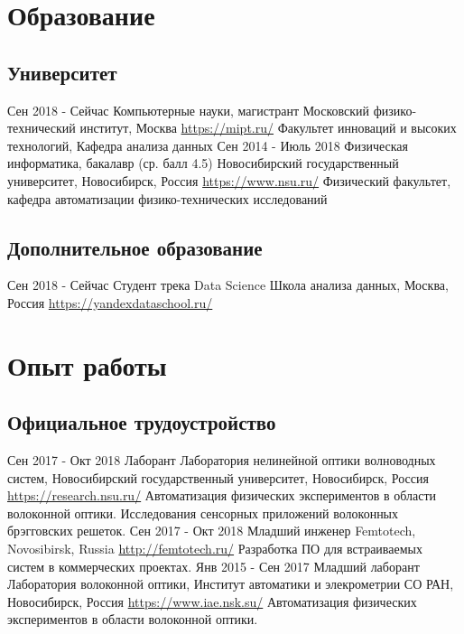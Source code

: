 \documentclass[11pt,a4paper]{moderncv}
\begin{document}
\maketitle

\section{Образование}
  \subsection{Университет}
  \cventry
    {Сен 2018 - Сейчас}
    {Компьютерные науки, магистрант}
    {\newline{}Московский физико-технический институт, Москва}
    {\newline\url{https://mipt.ru/}}{}
    {Факультет инноваций и высоких технологий, Кафедра анализа данных}
  \cventry
    {Сен 2014 - Июль 2018}
    {Физическая информатика, бакалавр (ср. балл 4.5)}
    {\newline{}Новосибирский государственный университет, Новосибирск, Россия}
    {\newline\url{https://www.nsu.ru/}}{}
    {Физический факультет, кафедра автоматизации физико-технических исследований}
  \subsection{Дополнительное образование}
  \cventry
    {Сен 2018 - Сейчас}
    {Студент трека Data Science}
    {\newline{}Школа анализа данных, Москва, Россия}
    {}{\newline\url{https://yandexdataschool.ru/}}{}

\section{Опыт работы}
\subsection{Официальное трудоустройство}
\cventry
  {Сен 2017 - Окт 2018}
  {Лаборант}
  {\newline{}Лаборатория нелинейной оптики волноводных систем, \newline{}
  Новосибирский государственный университет, Новосибирск, Россия}
  {\newline{}\url{https://research.nsu.ru/}}{}
  {Автоматизация физических экспериментов в области волоконной оптики. Исследования сенсорных приложений волоконных брэгговских решеток.}
\cventry
  {Сен 2017 - Окт 2018}
  {Младший инженер}
  {\newline{}Femtotech, Novosibirsk, Russia}
  {\newline{}\url{http://femtotech.ru/}}{}
  {Разработка ПО для встраиваемых систем в коммерческих проектах.}
\cventry
  {Янв 2015 - Сен 2017}
  {Младший лаборант}
  {\newline{}Лаборатория волоконной оптики, \newline{}
  Институт автоматики и элекрометрии СО РАН, Новосибирск, Россия}
  {\newline{}\url{https://www.iae.nsk.su/}}{}
  {Автоматизация физических экспериментов в области волоконной оптики.}
\end{document}
